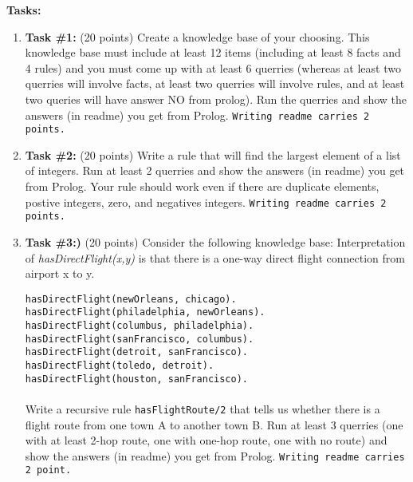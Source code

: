 \documentclass[paper=letter, fontsize=11pt]{scrartcl} %
\begin{document}
    \textbf{Tasks:}
    \begin{enumerate}

        \item \textbf{Task \#1:} (20 points) Create a knowledge base of your choosing. This knowledge base must include 
at least 12 items (including at least 8 facts and 4 rules) and you must come up with at least 6 querries (whereas at 
least two querries will involve facts, at least two querries will involve rules, and at least two queries will have answer 
NO from prolog). Run the querries and show the answers (in readme) you get from Prolog. \texttt{Writing readme carries 2 points.}

       \item \textbf{Task \#2:} (20 points) Write a rule that will find the largest element of a list of integers. 
Run at least 2 querries and show the answers (in readme) you get from Prolog. 
Your rule should work even if there are duplicate elements, postive integers, zero, and negatives integers. \texttt{Writing readme carries 2 points.}


        \item \textbf{Task \#3:)} (20 points) Consider the following knowledge base: 
Interpretation of \emph{hasDirectFlight(x,y)} is that there is a one-way direct flight connection from airport x to y.
         
        \texttt{hasDirectFlight(newOrleans, chicago).\\
        hasDirectFlight(philadelphia, newOrleans).\\
        hasDirectFlight(columbus, philadelphia).\\
        hasDirectFlight(sanFrancisco, columbus).\\
        hasDirectFlight(detroit, sanFrancisco).\\
        hasDirectFlight(toledo, detroit).\\
        hasDirectFlight(houston, sanFrancisco).\\
        } \\
        Write a recursive rule \texttt{hasFlightRoute/2} that tells us whether there is a flight route 
from one town A to another town B. Run at least 3 querries (one with at least 2-hop route, one with one-hop route, one with no route) 
and show the answers (in readme) you get from Prolog. \texttt{Writing readme carries 2 point.} 

    
    \end{enumerate}
\end{document}

